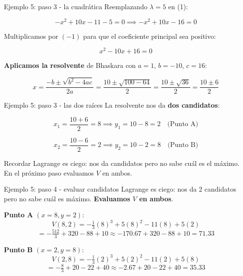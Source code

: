 \documentclass{beamer}
\begin{document}
\begin{frame}{Ejemplo 5: paso 3 - la cuadrática}
    \small
    Reemplazando $\lambda = 5$ en (1):

    \[
    -x^2 + 10x - 11 - 5 = 0 \implies -x^2 + 10x - 16 = 0
    \]

    \vspace{0.3em}

    Multiplicamos por $(-1)$ para que el coeficiente principal sea positivo:

    \[
    x^2 - 10x + 16 = 0
    \]

    \vspace{0.5em}

    \textbf{Aplicamos la resolvente} de Bhaskara con $a=1$, $b=-10$, $c=16$:

    \[
    x = \frac{-b \pm \sqrt{b^2 - 4ac}}{2a} = \frac{10 \pm \sqrt{100 - 64}}{2} = \frac{10 \pm \sqrt{36}}{2} = \frac{10 \pm 6}{2}
    \]
\end{frame}

\begin{frame}{Ejemplo 5: paso 3 - las dos raíces}
    \small
    La resolvente nos da \textbf{dos candidatos}:

    \vspace{0.8em}

    \[
    x_1 = \frac{10 + 6}{2} = 8 \implies y_1 = 10 - 8 = 2 \quad \text{(Punto A)}
    \]

    \vspace{0.5em}

    \[
    x_2 = \frac{10 - 6}{2} = 2 \implies y_2 = 10 - 2 = 8 \quad \text{(Punto B)}
    \]

    \vspace{0.8em}

    \begin{alertblock}{Recordar}
        Lagrange es ciego: nos da candidatos pero no sabe cuál es el máximo. En el próximo paso evaluamos $V$ en ambos.
    \end{alertblock}
\end{frame}

\begin{frame}{Ejemplo 5: paso 4 - evaluar candidatos}
    \small
    Lagrange es ciego: nos da 2 candidatos pero no sabe cuál es máximo. \textbf{Evaluamos $V$ en ambos}.

    \vspace{0.5em}

    \textbf{Punto A} $(x=8, y=2)$:
    \[
    V(8, 2) = -\tfrac{1}{3}(8)^3 + 5(8)^2 - 11(8) + 5(2)
    \]
    \[
    = -\tfrac{512}{3} + 320 - 88 + 10 \approx -170.67 + 320 - 88 + 10 = 71.33
    \]

    \vspace{0.5em}

    \textbf{Punto B} $(x=2, y=8)$:
    \[
    V(2, 8) = -\tfrac{1}{3}(2)^3 + 5(2)^2 - 11(2) + 5(8)
    \]
    \[
    = -\tfrac{8}{3} + 20 - 22 + 40 \approx -2.67 + 20 - 22 + 40 = 35.33
    \]
\end{frame}
\end{document}
